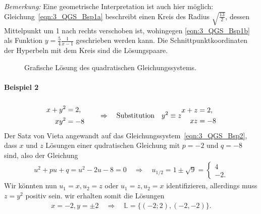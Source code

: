 \emph{Bemerkung:} Eine geometrische Interpretation ist auch hier möglich: Gleichung~\eqref{eqn:3_QGS_Bsp1a} beschreibt einen Kreis des Radius $\sqrt{\frac{13}{2}}$, dessen Mittelpunkt um 1 nach rechts verschoben ist, wohingegen \eqref{eqn:3_QGS_Bsp1b} als Funktion $y = \frac{5}{4}\frac{1}{x-1}$ geschrieben werden kann. Die Schnittpunktkoordinaten der Hyperbeln mit dem Kreis sind die Lösungspaare. 
\begin{figure}[htp]
    \centering
    \caption{Grafische Lösung des quadratischen Gleichungssystems.}
\end{figure}

\paragraph{Beispiel 2}$~$
\begin{align}
    \begin{split}     
        x + y^2 &= 2, \\
        x y^2 &= -8 
    \end{split} 
    \qquad\Rightarrow\qq{Substitution} y^2 \equiv z 
    \begin{split}
        x+ z &= 2, \\
        xz &= -8
    \end{split}\label{eqn:3_QGS_Bsp2}
\end{align}
Der Satz von Vieta angewandt auf das Gleichungssystem~\eqref{eqn:3_QGS_Bsp2}, dass $x$ und $z$ Lösungen einer qudratischen Gleichung mit $p = -2$ und $q = -8$ sind, also der Gleichung 
\begin{align}
    u^2 + pu +q = u^2 -2u - 8 = 0 \quad \Rightarrow \quad u_{1/2} = 1 \pm \sqrt{9} = \begin{cases}
        4 \\ -2.
    \end{cases}
\end{align}
Wir könnten nun $u_1 = x, u_2 =z$ oder $u_1 = z, u_2 = x$ identifizieren, allerdings muss $z = y^2$ positiv sein. wir erhalten somit die Lösungen 
\begin{align}
    x= -2, y = \pm 2 \quad \Rightarrow \quad \mathbb{L} = \{(-2;2),(-2,-2)\}.
\end{align}